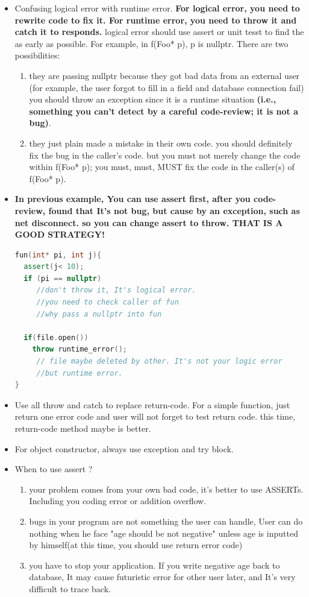 \documentclass[a4paper,12pt,twoside]{book}
\begin{document}
\begin{itemize}
\item Confusing logical error with runtime error. \textbf{For logical error, you need to rewrite code to fix it. For runtime error, you need to throw it and catch it to responds. } logical error should use assert  or unit tesst to find the as early as possible. For example, in f(Foo* p), p is nullptr. There are two possibilities:
\begin{enumerate}
\item they are passing nullptr because they got bad data from an external user (for example, the user forgot to fill in a field and database connection fail) you should throw an exception since it is a runtime situation \textbf{(i.e., something you can't detect by a careful code-review; it is not a bug)}.
\item they just plain made a mistake in their own code. you should definitely fix the bug in the caller's code. but you must not merely change the code within f(Foo* p); you must, must, MUST fix the code in the caller(s) of f(Foo* p).
\end{enumerate}
\item \textbf{ In previous example, You can use assert first, after you code-review, found that It's not bug, but cause by an exception, such as net disconnect. so you can change assert to throw. THAT IS  A GOOD STRATEGY!}

\begin{lstlisting}[frame=single, language=c++]
fun(int* pi, int j){
  assert(j< 10);
  if (pi == nullptr)
     //don't throw it, It's logical error.
     //you need to check caller of fun
     //why pass a nullptr into fun

  if(file.open())
    throw runtime_error();
     // file maybe deleted by other. It's not your logic error
     //but runtime error.
}
\end{lstlisting}
\item Use all throw and catch to replace return-code. For a simple function, just return one error code and user will not forget to test return code. this time, return-code method maybe is better.

\item For object constructor, always use exception and try block.

\item When to use assert ?
\begin{enumerate}
\item your problem comes from your own bad code, it's better to use ASSERTs.  Including you coding error or addition overflow.
\item bugs in your program are not something the user can handle, User can do nothing when he face "age should be not negative" unless age is inputted by himself(at this time, you should use return error code)
\item you have to stop your application. If you write negative age back to database, It may cause futuristic error for other user later, and It's very difficult to trace back.
\end{enumerate}



\end{itemize}
\end{document}
